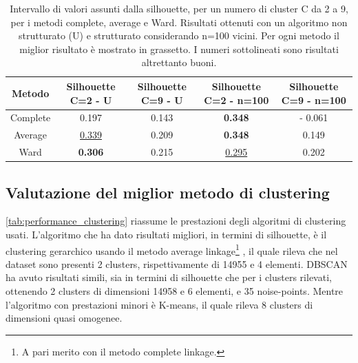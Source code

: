 \documentclass[a4paper]{article}
\begin{document}
\begin{table}
\setlength{\tabcolsep}{5pt} %
\renewcommand{\arraystretch}{1} %
\caption{Intervallo di valori assunti dalla silhouette, per un numero di cluster C da 2 a 9, per i metodi complete, average e Ward. Risultati ottenuti con un algoritmo non strutturato (U) e strutturato considerando n=100 vicini. Per ogni metodo il miglior risultato è mostrato in grassetto. I numeri sottolineati sono risultati altrettanto buoni.}

\begin{tabular}{|c|c|c|c|c|}

\hline 
Metodo & Silhouette C=2 - U & Silhouette C=9 - U & Silhouette C=2 - n=100 & Silhouette C=9 - n=100 \\ 
\hline
Complete & 0.197 & 0.143 & \textbf{0.348} & - 0.061 \\ 

Average & \underline{0.339} & 0.209 & \textbf{0.348} & 0.149 \\ 

Ward & \textbf{0.306} & 0.215 & \underline{0.295} & 0.202 \\ 
\hline 
\end{tabular}
\label{tab:hierarchical_silhouette}
\end{table}

\subsection{Valutazione del miglior metodo di clustering}
\autoref{tab:performance_clustering} riassume le prestazioni degli algoritmi di clustering usati. L'algoritmo che ha dato risultati migliori, in termini di silhouette, è il clustering gerarchico usando il metodo average linkage\footnote{A pari merito con il metodo complete linkage.} , il quale rileva che nel dataset sono presenti 2 clusters, rispettivamente di 14955 e 4 elementi. DBSCAN ha avuto risultati simili, sia in termini di silhouette che per i clusters rilevati, ottenendo 2 clusters di dimensioni 14958 e 6 elementi, e 35 noise-points. Mentre l'algoritmo con prestazioni minori è K-means, il quale rileva 8 clusters di dimensioni quasi omogenee. 
\end{document}

